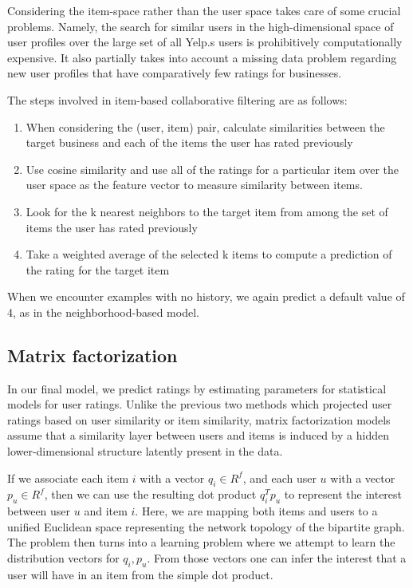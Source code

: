 \documentclass[letterpaper, 11 pt, conference]{ieeeconf}
\begin{document}
Considering the item-space rather than the user space takes care of some 
crucial problems. Namely, the search for similar users in the
high-dimensional space of user profiles over the large set of all Yelp.s
users is prohibitively computationally expensive. It also partially takes
into account a missing data problem regarding new user profiles that have
comparatively few ratings for businesses.

The steps involved in item-based collaborative filtering are as follows:
\begin{enumerate}
\item When considering the (user, item) pair, calculate similarities between
  the target business and each of the items the user has rated previously
\item Use cosine similarity and use all of the ratings for a particular item
  over the user space as the feature vector to measure similarity between
  items.
\item Look for the k nearest neighbors to the target item from among the set of
  items the user has rated previously
\item Take a weighted average of the selected k items to compute a prediction
  of the rating for the target item
\end{enumerate}

When we encounter examples with no history, we again predict a default value 
of 4, as in the neighborhood-based model.


\subsection{Matrix factorization}

In our final model, we predict ratings by estimating
parameters for statistical models for user ratings. Unlike the previous
two methods which projected user ratings based on user similarity or
item similarity, matrix factorization models assume that a similarity layer
between users and items is induced by a hidden lower-dimensional structure
latently present in the data.

If we associate each item $i$ with a vector $q_i \in R^f$, and each user $u$ with a
vector $p_u \in R^f$, then we can use the resulting dot product $q_i^Tp_u$ to represent
the interest between user $u$ and item $i$.
Here, we are mapping both items and users to a unified Euclidean space
representing the network topology of the bipartite graph.
The problem then turns into a
learning problem where we attempt to learn the distribution vectors for
$q_i,p_u$. From those vectors one can infer the interest that a user will
have in an item from the simple dot product.
\end{document}
